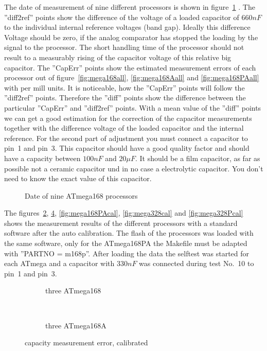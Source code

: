 The date of measurement of nine different processors is shown in figure~\ref{fig:CompAdjust} .
The ''diff2ref'' points show the difference of the voltage of a loaded capacitor of \(660 nF\) to the
individual internal reference voltages (band gap).
Ideally this difference Voltage should be zero, if the analog comparator has stopped the loading by the signal to
the processor. The short handling time of the processor should not result to a measurably rising of the 
capacitor voltage of this relative big capacitor.
The ''CapErr'' points show the estimated measurement errors of each processor out of figure~\ref{fig:mega168all}, \ref{fig:mega168Aall} 
and \ref{fig:mega168PAall} with per mill units.
It is noticeable, how the ''CapErr'' points will follow the ''diff2ref'' points.
Therefore the ''diff'' points show the difference between the particular ''CapErr'' and ''diff2ref'' points.
With a mean value of the ''diff'' points we can get a good estimation for the correction of the capacitor measurements 
together with the difference voltage of the loaded capacitor and the internal reference.
For the second part of adjustment you must connect a capacitor to pin~1 and pin~3. This capacitor should have
a good quality factor and should have a capacity between \(100 nF\) and \(20 \mu F\).
It should be a film capacitor, as far as possible not a ceramic capacitor und in no case a electrolytic capacitor.
You don't need to know the exact value of this capacitor.

\begin{figure}[H]
\centering

\caption{Date of nine ATmega168 processors}
\label{fig:CompAdjust}
\end{figure}

The figures~\ref{fig:mega168cal}, \ref{fig:mega168Acal}, \ref{fig:mega168PAcal}, \ref{fig:mega328cal} and \ref{fig:mega328Pcal}
 shows the measurement results
of the different processors with a standard software after the auto calibration.
The flash of the processors was loaded with the same software, only for the ATmega168PA the Makefile must be
adapted with ''PARTNO = m168p''.
After loading the data the selftest was started for each ATmega and a capacitor with \(330 nF\) was connected
during test No.~10 to pin~1 and pin~3.

\begin{figure}[H]
  \begin{subfigure}[b]{9cm}
    \centering
    \resizebox{9cm}{!}{}
    \caption{three ATmega168}
    \label{fig:mega168cal}
  \end{subfigure}
  ~
  \begin{subfigure}[b]{9cm}
    \centering
    \resizebox{9cm}{!}{}
    \caption{three ATmega168A}
    \label{fig:mega168Acal}
  \end{subfigure}
  \caption{capacity measurement error, calibrated}
\end{figure}

